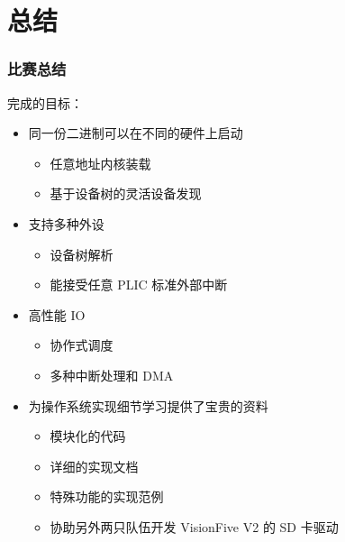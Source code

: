 \section{总结}

\begin{frame}
    \frametitle{比赛总结}

    完成的目标：
    \begin{itemize}
        \item 同一份二进制可以在不同的硬件上启动
              \begin{itemize}
                  \item 任意地址内核装载
                  \item 基于设备树的灵活设备发现
              \end{itemize}
        \item 支持多种外设
              \begin{itemize}
                  \item 设备树解析
                  \item 能接受任意 PLIC 标准外部中断
              \end{itemize}
        \item 高性能 IO
              \begin{itemize}
                  \item 协作式调度
                  \item 多种中断处理和 DMA
              \end{itemize}
        \item 为操作系统实现细节学习提供了宝贵的资料
              \begin{itemize}
                  \item 模块化的代码
                  \item 详细的实现文档
                  \item 特殊功能的实现范例
                  \item 协助另外两只队伍开发 VisionFive V2 的 SD 卡驱动
              \end{itemize}
    \end{itemize}

\end{frame}